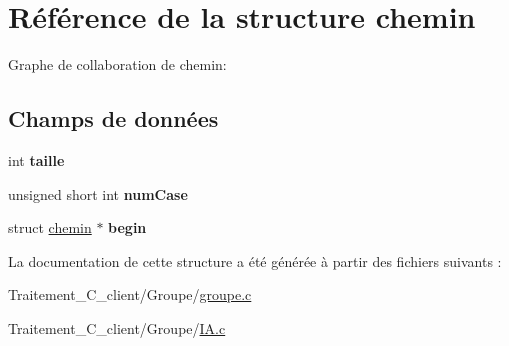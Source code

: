 \hypertarget{structchemin}{}\section{Référence de la structure chemin}
\label{structchemin}


Graphe de collaboration de chemin\+:
\subsection*{Champs de données}
\begin{DoxyCompactItemize}
\item 
int {\bfseries taille}\hypertarget{structchemin_a29bf3fc0ffe4e72e45f0c84ab4f8cd1e}{}\label{structchemin_a29bf3fc0ffe4e72e45f0c84ab4f8cd1e}

\item 
unsigned short int {\bfseries num\+Case}\hypertarget{structchemin_a839e5e9cb3976c4557ff9421edca312d}{}\label{structchemin_a839e5e9cb3976c4557ff9421edca312d}

\item 
struct \hyperlink{structchemin}{chemin} $\ast$ {\bfseries begin}\hypertarget{structchemin_a96269b4798d838bf3155363ad1cef230}{}\label{structchemin_a96269b4798d838bf3155363ad1cef230}

\end{DoxyCompactItemize}


La documentation de cette structure a été générée à partir des fichiers suivants \+:\begin{DoxyCompactItemize}
\item 
Traitement\+\_\+\+C\+\_\+client/\+Groupe/\hyperlink{groupe_8c}{groupe.\+c}\item 
Traitement\+\_\+\+C\+\_\+client/\+Groupe/\hyperlink{_i_a_8c}{I\+A.\+c}\end{DoxyCompactItemize}
